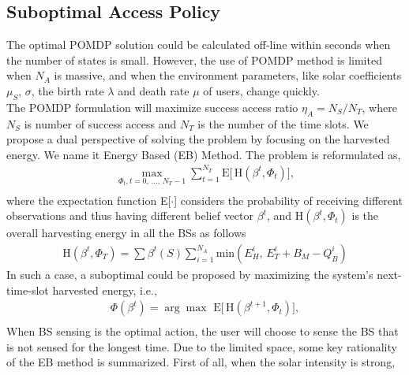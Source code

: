 \documentclass[conference]{IEEEtran}
\begin{document}
\subsection{Suboptimal Access Policy}
The optimal POMDP solution could be calculated off-line within seconds when the number of states is small.
However, the use of POMDP method is limited when \(N_A\) is massive,
and when the environment parameters, like solar coefficients \(\mu_S\), \(\sigma\),
the birth rate \(\lambda\) and death rate \(\mu\) of users, change quickly.\\
The POMDP formulation will maximize success access ratio \(\eta_A = N_S/N_T\),
where \(N_S\) is number of success access and \(N_T\) is the number of the time slots.
We propose a dual perspective of solving the problem by focusing on the harvested energy.
We name it Energy Based (EB) Method.
The problem is reformulated as,
\begin{equation}
\begin{aligned}
	\underset{\Phi_t,t=0,\,\ldots,\,N_T-1}{\max}\sum\nolimits_{t=1}^{N_T}
	\mbox{E}\big[\,\mbox{H}\left(\beta^t, \Phi_t\right)\big],\\
\end{aligned}
\end{equation}
where the expectation function E[\(\cdot\)] considers the probability of receiving different observations
and thus having different belief vector \(\beta^t\), and $\mbox{H}\left(\beta^t, \Phi_t\right)$ is the overall harvesting energy in all the BSs as follows
\begin{equation}
\begin{aligned}
	\mbox{H}\left(\beta^t, \Phi_T\right) = \sum\beta^t\left(S\right)\sum_{i=1}^{N_A}
	\mbox{min}\left(E_H^i,\,E_T^i+B_M-Q_B^i\right)
\end{aligned}
\end{equation}
In such a case, a suboptimal could be proposed by maximizing the system's next-time-slot harvested energy, i.e.,
\begin{equation}
\begin{aligned}
	\Phi\left(\beta^t\right) = \arg{\max}\,\,\mbox{E}\big\lbrack\,\mbox{H}(\beta^{t+1}, \Phi_t)\big\rbrack,\\
\end{aligned}
\end{equation}
When BS sensing is the optimal action, the user will choose to sense the BS that is not sensed for the longest time.
Due to the limited space, some key rationality of the EB method is summarized.
First of all, when the solar intensity is strong,
\end{document}
